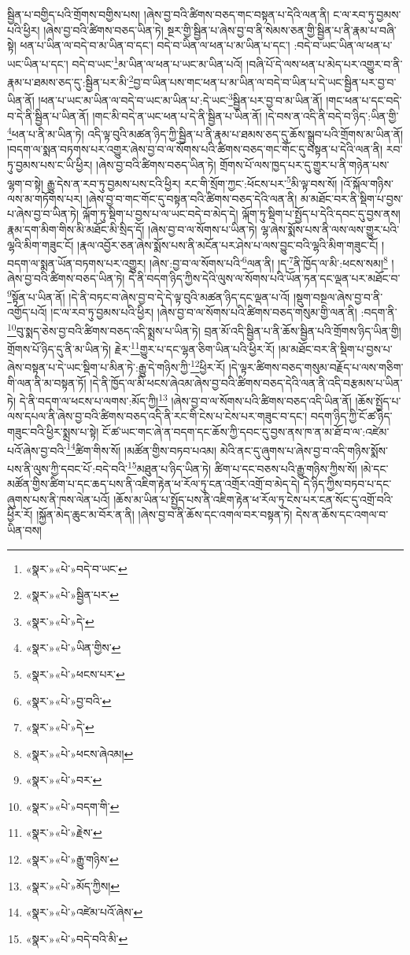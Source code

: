 སྦྱིན་པ་བགྱིད་པའི་གྲོགས་བགྱིས་པས། །ཞེས་བྱ་བའི་ཚིགས་བཅད་གང་བསྟན་པ་དེའི་ལན་ནི། ང་ལ་རབ་ཏུ་བྱམས་པའི་ཕྱིར། །ཞེས་བྱ་བའི་ཚིགས་བཅད་ཡིན་ཏེ། སྔར་གྱི་སྦྱིན་པ་ཞེས་བྱ་བ་ནི་སེམས་ཅན་གྱི་སྦྱིན་པ་ནི་རྣམ་པ་བཞི་སྟེ། ཕན་པ་ཡིན་ལ་བདེ་བ་མ་ཡིན་བ་དང་། བདེ་བ་ཡིན་ལ་ཕན་པ་མ་ཡིན་པ་དང་། :བདེ་བ་ཡང་ཡིན་ལ་ཕན་པ་ཡང་ཡིན་པ་དང་། བདེ་བ་ཡང་\footnote{«སྣར་»«པེ་»བདེ་བ་ཡང་}མ་ཡིན་ལ་ཕན་པ་ཡང་མ་ཡིན་པའོ། །བཞི་པོ་དེ་ལས་ཕན་པ་མེད་པར་འགྱུར་བ་ནི་རྣམ་པ་ཐམས་ཅད་དུ་:སྦྱིན་པར་མི་\footnote{«སྣར་»«པེ་»སྦྱིན་པར་}བྱ་བ་ཡིན་པས་གང་ཕན་པ་མ་ཡིན་ལ་བདེ་བ་ཡིན་པ་དེ་ཡང་སྦྱིན་པར་བྱ་བ་ཡིན་ནོ། །ཕན་པ་ཡང་མ་ཡིན་ལ་བདེ་བ་ཡང་མ་ཡིན་པ་:དེ་ཡང་\footnote{«སྣར་»«པེ་»དེ་}སྦྱིན་པར་བྱ་བ་མ་ཡིན་ནོ། །གང་ཕན་པ་དང་བདེ་བ་དེ་ནི་སྦྱིན་པ་ཡིན་ནོ། །གང་མི་བདེ་ན་ཡང་ཕན་པ་དེ་ནི་སྦྱིན་པ་ཡིན་ནོ། །དེ་བས་ན་འདི་ནི་བདེ་བ་ཉིད་:ཡིན་གྱི་\footnote{«སྣར་»«པེ་»ཡིན་གྱིས་}ཕན་པ་ནི་མ་ཡིན་ཏེ། འདི་ལྟ་བུའི་མཚན་ཉིད་ཀྱི་སྦྱིན་པ་ནི་རྣམ་པ་ཐམས་ཅད་དུ་ཆོས་སྒྲུབ་པའི་གྲོགས་མ་ཡིན་ནོ། །བདག་ལ་སྨན་བཏགས་པར་འགྱུར་ཞེས་བྱ་བ་ལ་སོགས་པའི་ཚིགས་བཅད་གང་གོང་དུ་བསྟན་པ་དེའི་ལན་ནི། རབ་ཏུ་བྱམས་པས་ང་ཡི་ཕྱིར། །ཞེས་བྱ་བའི་ཚིགས་བཅད་ཡིན་ཏེ། གྲོགས་པོ་ལས་ཁྱད་པར་དུ་གྱུར་པ་ནི་གཉེན་པས་ལྷག་བ་སྟེ། རྒྱུ་དེས་ན་རབ་ཏུ་བྱམས་པས་ངའི་ཕྱིར། རང་གི་སྲོག་ཀྱང་:ཕོངས་པར་\footnote{«སྣར་»«པེ་»ཕངས་པར་}མི་ལྟ་བས་སོ། །འོ་སྐོལ་གཉིས་ལས་མ་གཏོགས་པར། །ཞེས་བྱ་བ་གང་གོང་དུ་བསྟན་བའི་ཚིགས་བཅད་དེའི་ལན་ནི། མ་མཐོང་བར་ནི་སྡིག་པ་བྱས་པ་ཞེས་བྱ་བ་ཡིན་ཏེ། ལྐོག་ཏུ་སྡིག་པ་བྱས་པ་ལ་ཡང་བདེ་བ་མེད་དེ། ལྐོག་ཏུ་སྡིག་པ་སྤྱོད་པ་དེའི་དབང་དུ་བྱས་ནས། རྣམ་དག་མིག་གིས་མི་མཐོང་མི་སྲིད་དོ། །ཞེས་བྱ་བ་ལ་སོགས་པ་ཡིན་ཏེ། ལྷ་ཞེས་སྨོས་པས་ནི་ལས་ལས་གྱུར་པའི་ལྷའི་མིག་གཟུང་ངོ། །རྣལ་འབྱོར་ཅན་ཞེས་སྨོས་པས་ནི་མངོན་པར་ཤེས་པ་ལས་བྱུང་བའི་ལྷའི་མིག་གཟུང་ངོ། །བདག་ལ་སྨན་ཡོན་བཏགས་པར་འགྱུར། །ཞེས་:བྱ་བ་ལ་སོགས་པའི་\footnote{«སྣར་»«པེ་»བྱ་བའི་}ལན་ནི། །ད་\footnote{«སྣར་»«པེ་»དེ་}ནི་ཁྱོད་ལ་མི་:ཕངས་སམ།\footnote{«སྣར་»«པེ་»ཕངས་ཞེའམ།} །ཞེས་བྱ་བའི་ཚིགས་བཅད་ཡིན་ཏེ། དེ་ནི་བདག་ཉིད་ཀྱིས་དེའི་ལུས་ལ་སོགས་པའི་ཡོན་ཏན་དང་ལྡན་པར་མཐོང་བ་\footnote{«སྣར་»«པེ་»བར་}སྟོན་པ་ཡིན་ནོ། །དེ་ནི་བཏང་བ་ཞེས་བྱ་བ་དེ་དེ་ལྟ་བུའི་མཚན་ཉིད་དང་ལྡན་པ་འོ། །སྡུག་བསྔལ་ཞེས་བྱ་བ་ནི་འགྱོད་པའོ། །ང་ལ་རབ་ཏུ་བྱམས་པའི་ཕྱིར། །ཞེས་བྱ་བ་ལ་སོགས་པའི་ཚིགས་བཅད་གསུམ་གྱི་ལན་ནི། :བདག་ནི་\footnote{«སྣར་»«པེ་»བདག་གི་}བུ་སྨད་ཅེས་བྱ་བའི་ཚིགས་བཅད་འདི་སྨྲས་པ་ཡིན་ཏེ། བྲན་མོ་འདི་སྦྱིན་པ་ནི་ཆོས་སྦྱིན་པའི་གྲོགས་ཉིད་ཡིན་གྱི། གྲོགས་པོ་ཉིད་དུ་ནི་མ་ཡིན་ཏེ། རྗེར་\footnote{«སྣར་»«པེ་»རྗེས་}གྱུར་པ་དང་ལྷན་ཅིག་ཡིན་པའི་ཕྱིར་རོ། །མ་མཐོང་བར་ནི་སྡིག་པ་བྱས་པ་ཞེས་བསྟན་པ་དེ་ཡང་སྡིག་པ་མིན་ཏེ་:རྒྱུ་དེ་གཉིས་ཀྱི་\footnote{«སྣར་»«པེ་»རྒྱུ་གཉིས་}ཕྱིར་རོ། །དེ་ལྟར་ཚིགས་བཅད་གསུམ་བརྗོད་པ་ལས་གཅིག་གི་ལན་ནི་མ་བསྟན་ཏོ། །དེ་ནི་ཁྱོད་ལ་མི་ཕངས་ཞེའམ་ཞེས་བྱ་བའི་ཚིགས་བཅད་དེའི་ལན་ནི་འདི་བརྩམས་པ་ཡིན་ཏེ། དེ་ནི་བདག་ལ་ཕངས་པ་ལགས་:མོད་ཀྱི།\footnote{«སྣར་»«པེ་»མོད་ཀྱིས།} །ཞེས་བྱ་བ་ལ་སོགས་པའི་ཚིགས་བཅད་འདི་ཡིན་ནོ། །ཆོས་སྤྱོད་པ་ལས་དཔལ་ནི་ཞེས་བྱ་བའི་ཚིགས་བཅད་འདི་ནི་རང་གི་ངེས་པ་ངེས་པར་གཟུང་བ་དང་། བདག་ཉིད་ཀྱི་ངོ་ཚ་ཉིད་གཟུང་བའི་ཕྱིར་སྨྲས་པ་སྟེ། ངོ་ཚ་ཡང་གང་ཞེ་ན་བདག་དང་ཆོས་ཀྱི་དབང་དུ་བྱས་ནས་ཁ་ན་མ་ཐོ་བ་ལ་:འཛེམ་པའོ་ཞེས་བྱ་བའི་\footnote{«སྣར་»«པེ་»འཛེམ་པའོ་ཞེས་}ཚིག་གིས་སོ། །མཚོན་གྱིས་བཏབ་པའམ། མེའི་ནང་དུ་ཞུགས་པ་ཞེས་བྱ་བ་འདི་གཉིས་སྨོས་པས་ནི་ལུས་ཀྱི་དབང་པོ་:བདེ་བའི་\footnote{«སྣར་»«པེ་»བདེ་བའི་མི་}མཐུན་པ་ཉིད་ཡིན་ཏེ། ཚིག་པ་དང་བཅས་པའི་རྒྱུ་གཉིས་ཀྱིས་སོ། །མེ་དང་མཚོན་གྱིས་ཚིག་པ་དང་ཆད་པས་ནི་འཇིག་རྟེན་ཕ་རོལ་ཏུ་ངན་འགྲོར་འགྲོ་བ་མེད་དེ། དེ་ཉིད་ཀྱིས་བཏབ་པ་དང་ཞུགས་པས་ནི་ཁས་ལེན་པའོ། །ཆོས་མ་ཡིན་པ་སྤྱོད་པས་ནི་འཇིག་རྟེན་ཕ་རོལ་ཏུ་ངེས་པར་ངན་སོང་དུ་འགྲོ་བའི་ཕྱིར་རོ། །སྐྱོན་མེད་ཆུང་མ་བོར་ན་ནི། །ཞེས་བྱ་བ་ནི་ཆོས་དང་འགལ་བར་བསྟན་ཏེ། དེས་ན་ཆོས་དང་འགལ་བ་ཡིན་བས། 